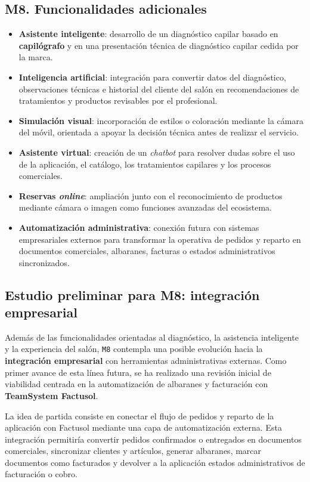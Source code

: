 \subsection*{M8. Funcionalidades adicionales}

\begin{itemize}
    \item \textbf{Asistente inteligente}: desarrollo de un diagnóstico capilar basado en \textbf{capilógrafo} y en una presentación técnica de diagnóstico capilar cedida por la marca.
    \item \textbf{Inteligencia artificial}: integración para convertir datos del diagnóstico, observaciones técnicas e historial del cliente del salón en recomendaciones de tratamientos y productos revisables por el profesional.
    \item \textbf{Simulación visual}: incorporación de estilos o coloración mediante la cámara del móvil, orientada a apoyar la decisión técnica antes de realizar el servicio.
    \item \textbf{Asistente virtual}: creación de un \textit{chatbot} para resolver dudas sobre el uso de la aplicación, el catálogo, los tratamientos capilares y los procesos comerciales.
    \item \textbf{Reservas \textit{online}}: ampliación junto con el reconocimiento de productos mediante cámara o imagen como funciones avanzadas del ecosistema.
    \item \textbf{Automatización administrativa}: conexión futura con sistemas empresariales externos para transformar la operativa de pedidos y reparto en documentos comerciales, albaranes, facturas o estados administrativos sincronizados.
\end{itemize}

\subsection*{Estudio preliminar para M8: integración empresarial}

Además de las funcionalidades orientadas al diagnóstico, la asistencia inteligente y la experiencia del salón, \texttt{M8} contempla una posible evolución hacia la \textbf{integración empresarial} con herramientas administrativas externas. Como primer avance de esta línea futura, se ha realizado una revisión inicial de viabilidad centrada en la automatización de albaranes y facturación con \textbf{TeamSystem Factusol}.

La idea de partida consiste en conectar el flujo de pedidos y reparto de la aplicación con Factusol mediante una capa de automatización externa. Esta integración permitiría convertir pedidos confirmados o entregados en documentos comerciales, sincronizar clientes y artículos, generar albaranes, marcar documentos como facturados y devolver a la aplicación estados administrativos de facturación o cobro.

